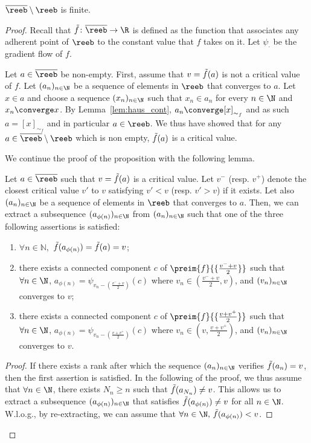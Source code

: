 \begin{proposition}\label{prop:reeb_finite}
$\overline{\reeb}\setminus\reeb$ is finite.
\end{proposition}
\begin{proof}
Recall that $\Tilde{f}\colon \overline{\reeb}\rightarrow\R$ is defined as the function that associates any adherent point of $\reeb$ to the constant value that $f$ takes on it. Let $\psi_{\cdot}$ be the gradient flow of $f$.


 Let $a\in\overline{\reeb}$ be non-empty. First, assume that $v=\Tilde{f}(a)$ is not a critical value of $f$. Let $(a_n)_{n\in\N}$ be a sequence of elements in $\reeb$ that converges to $a$. Let $x\in a$ and choose a sequence $(x_n)_{n\in\N}$ such that $x_n\in a_n$ for every $n\in\N$ and $x_n\converge x$. By Lemma~\ref{lem:haus_cont}, $a_n\converge[x]_{\sim_f}$ and as such $a=[x]_{\sim_f}$ and in particular  $a\in\reeb$. We thus have showed that for any  $a\in\overline{\reeb}\setminus\reeb$ which is non empty, $\Tilde{f}(a)$ is a critical value.
 
We continue the proof of the proposition with the following lemma.

\begin{lemma} 
\label{lem:3cases}
Let $a\in\overline{\reeb}$ such that $v=\Tilde{f}(a)$ is a critical value. Let $v^-$ (resp. $v^+$) denote the closest critical value $v'$ to $v$ satisfying $v'<v$ (resp. $v'>v$) if it exists.  
Let also $(a_n)_{n\in\N}$ be a sequence of elements in $\reeb$ that converges to $a$. Then, we can extract a subsequence $(a_{\phi(n)})_{n\in\N}$ from $(a_n)_{n\in\N}$ such that one of the three following assertions is satisfied:
\begin{enumerate}
    \item $\forall n\in\mathbb{N}, $ $\Tilde{f}(a_{\phi(n)})=\Tilde{f}(a) = v$;
    \item there exists a connected component $c$ of $\preim{f}{\{\frac{v^-+v}{2}\}}$ such that $\forall n\in\N$, $a_{\phi(n)}=\psi_{v_n-(\frac{v^-+v}{2})}(c)$ where $v_n\in(\frac{v^-+v}{2},v) $, and $(v_n)_{n\in\N}$ converges to $v$;
    \item there exists a connected component $c$ of $\preim{f}{\{\frac{v+v^+}{2}\}}$  such that $\forall n\in\N$, $a_{\phi(n)}=\psi_{v_n-(\frac{v+v^+}{2})}(c)$ where $v_n\in(v,\frac{v+v^+}{2})$, and $(v_n)_{n\in\N}$ converges to $v$.
\end{enumerate}
\end{lemma}

\begin{proof}
If there exists a rank after which the sequence $(a_n)_{n\in\N}$ verifies $\Tilde{f}(a_n)=v$, then the first assertion is satisfied. In the following of the proof, we thus assume that $\forall n\in\N$, there exists $N_n\geq n$ such that $\Tilde{f}(a_{N_n})\neq v$. This allows us to extract a subsequence $(a_{\phi(n)})_{n\in\N}$ that satisfies $\Tilde{f}(a_{\phi(n)})\neq v$ for all $n\in\N$. W.l.o.g., by re-extracting, we can assume that $\forall n\in \N,\,\Tilde{f}(a_{\phi(n)})< v$.


\end{proof}
\end{proof}
